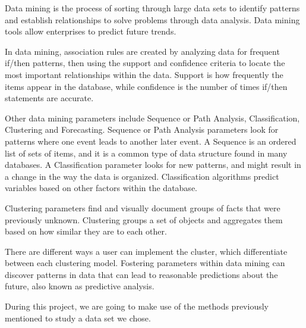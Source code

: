 
Data mining is the process of sorting through large data sets to identify patterns and establish relationships to solve problems through data analysis. Data mining tools allow enterprises to predict future trends. 

In data mining, association rules are created by analyzing data for frequent if/then patterns, then using the support and confidence criteria to locate the most important relationships within the data. Support is how frequently the items appear in the database, while confidence is the number of times if/then statements are accurate.

Other data mining parameters include Sequence or Path Analysis, Classification, Clustering and Forecasting. Sequence or Path Analysis parameters look for patterns where one event leads to another later event. A Sequence is an ordered list of sets of items, and it is a common type of data structure found in many databases. A Classification parameter looks for new patterns, and might result in a change in the way the data is organized. Classification algorithms predict variables based on other factors within the database.

Clustering parameters find and visually document groups of facts that were previously unknown. Clustering groups a set of objects and aggregates them based on how similar they are to each other.

There are different ways a user can implement the cluster, which differentiate between each clustering model. Fostering parameters within data mining can discover patterns in data that can lead to reasonable predictions about the future, also known as predictive analysis.

During this project, we are going to make use of the methods previously mentioned to study a data set we chose.
